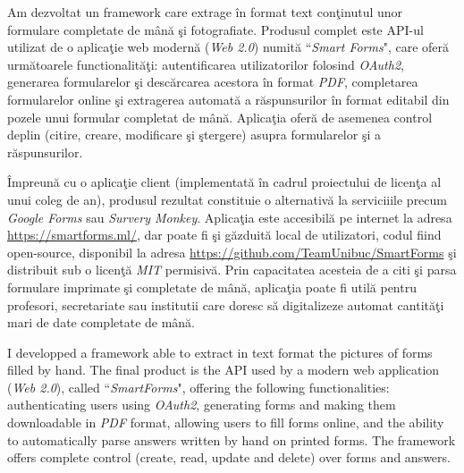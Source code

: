 \documentclass[11pt, a4paper]{report}
\newenvironment{abstractpage}
  {\cleardoublepage\vspace*{\fill}\thispagestyle{empty}}
  {\vfill\cleardoublepage}
\renewenvironment{abstract}[1]
  {\bigskip
  \begin{center}\bfseries\abstractname\end{center}}
  {\par\bigskip}
\begin{document}
\begin{abstractpage}

  \begin{abstract}{}
  Am dezvoltat un framework care extrage \^ in format text con\c tinutul unor formulare completate de m\^an\u a \c si fotografiate.
  Produsul complet este API-ul utilizat de o aplica\c{t}ie web modern\u{a} (\textit{Web 2.0}) numit\u{a} ``\textit{Smart Forms}", care ofer\u a urm\u atoarele functionalit\u a\c{t}i: autentificarea utilizatorilor folosind \textit{OAuth2}, generarea formularelor \c{s}i desc\u arcarea acestora \^{i}n format \textit{PDF}, completarea formularelor online \c si extragerea automat\u{a} a r\u aspunsurilor \^ in format editabil din pozele unui formular completat de m\^an\u a. Aplica\c tia ofer\u a de asemenea control deplin (citire, creare, modificare \c si \c{s}tergere) asupra formularelor \c{s}i a r\u{a}spunsurilor.
  
  \^{I}mpreun\u{a} cu o aplica\c{t}ie client (implementat\u{a} \^ in cadrul proiectului de licen\c ta al unui coleg de an), produsul rezultat constituie o alternativ\u a la serviciiile precum \textit{Google Forms} sau \textit{Survery Monkey}. Aplica\c tia este accesibil\u a pe internet la adresa \url{https://smartforms.ml/}, dar poate fi \c si g\u azduit\u a local de utilizatori, codul fiind open-source, disponibil la adresa \url{https://github.com/TeamUnibuc/SmartForms} \c si distribuit sub o licen\c t\u a \textit{MIT} permisiv\u a. Prin capacitatea acesteia de a citi \c si parsa formulare imprimate \c si completate de m\^ an\u a, aplica\c tia poate fi util\u a pentru profesori, secretariate sau institutii care doresc s\u a digitalizeze automat cantit\u a\c ti mari de date completate de m\^an\u a. 
  
  \end{abstract}
  
  \begin{abstract}{}
  
  I developped a framework able to extract in text format the pictures of forms filled by hand. The final product is the API used by a modern web application (\textit{Web 2.0}), called ``\textit{SmartForms}", offering the following functionalities: authenticating users using \textit{OAuth2}, generating forms and making them downloadable in \textit{PDF} format, allowing users to fill forms online, and the ability to automatically parse answers written by hand on printed forms. The framework offers complete control (create, read, update and delete) over forms and answers.
  

\end{abstract}
\end{abstractpage}
\end{document}
